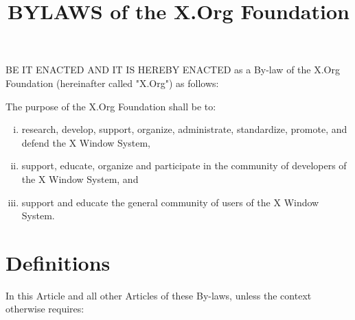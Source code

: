 \documentclass[10pt, english]{bylaws}
\begin{document}
\title{BYLAWS of the X.Org Foundation}
\maketitle
\date{}

BE IT ENACTED AND IT IS HEREBY ENACTED as a By-law of the X.Org Foundation
(hereinafter called "X.Org") as follows:


The purpose of the X.Org Foundation shall be to:
\begin{enumerate}[(i)\hspace{.2cm}]
	\item research, develop, support, organize, administrate, standardize,
	promote, and defend the X Window System,

	\item support, educate, organize and participate in the community of
	developers of the X Window System, and

	\item support and educate the general community of users of the X Window
	System.
\end{enumerate}


\section{Definitions}
In this Article and all other Articles of these By-laws, unless the context
otherwise requires:
\end{document}
